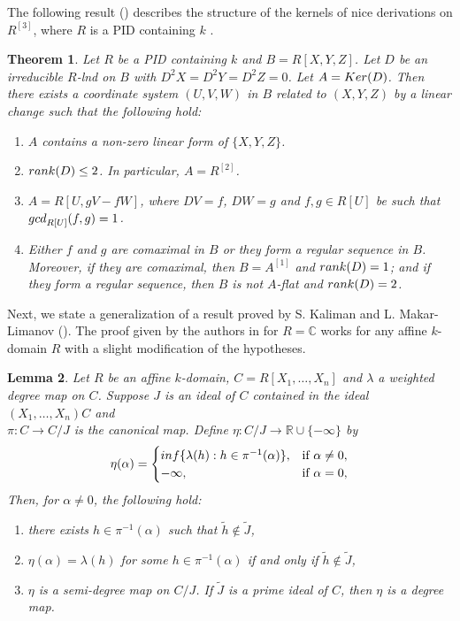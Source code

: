 \documentclass[a4paper,12pt]{article}
\newtheorem{thm}{Theorem}[section]
\newtheorem{lem}[thm]{Lemma}
\newcommand{\bR}{\mathbb R}
\newcommand{\bC}{\mathbb C}
\begin{document}
{\smallskip
\indent
The following result (\cite[Theorem 3.6]{DG}) describes the structure of the kernels of nice derivations on $R^{[3]}$, where $R$ is a PID containing $k$ .

\begin{thm}\label{Nice}
Let $R$ be a {\rm PID} containing $k$ and $B=R[X,Y,Z]$.
Let $D$ be an irreducible $R$-lnd on $B$ with $D^{2}X=D^{2}Y=D^{2}Z=0$. Let $A={\rm Ker}(D)$. 
Then there exists a coordinate system $(U,V,W)$ in $B$ related to $(X,Y,Z)$ by a linear change such that the following hold:
\begin{enumerate}
	\item [\rm (i)] $A$ contains a non-zero linear form of $\{X,Y,Z\}$.
	\item [\rm (ii)] ${\rm rank}(D)\leq 2$. In particular, $A=R^{[2]}$.
	\item [\rm (iii)] $A=R[U,gV-fW]$, where $DV=f$, $DW=g$ and $f,g\in R[U]$ be such that ${\rm gcd}_{R[U]}(f,g)=1$.
	\item [\rm (iv)] Either $f$ and $g$ are comaximal in $B$ or they form a regular sequence in $B$. Moreover, if they are 
	comaximal, then $B=A^{[1]}$ and ${\rm rank}(D)=1$; and if they form a regular sequence, then $B$ is not $A$-flat and ${\rm rank}(D)=2$. 
\end{enumerate}
\end{thm}

\smallskip
\indent
Next, we state a generalization of a result proved by S. Kaliman and L. Makar-Limanov (\cite{KML}). The proof given by the authors in \cite{KML} for $R=\bC$ works for any affine $k$-domain $R$ with a slight modification of the hypotheses.
\begin{lem}\label{MKL}
Let $R$ be an affine $k$-domain, $C=R[X_1,\dots,X_n]$ and $\lambda$ a weighted degree map on $C$. Suppose  $J$ is an ideal of $C$ contained in the ideal $(X_1,\dots,X_n)C$ and \\$\pi:C \rightarrow C/J$ is the canonical map. Define $\eta:C/J\longrightarrow\bR\cup\{-\infty\}$ by $$\eta(\alpha)=
\begin{cases}
	{\rm inf}\{\lambda(h):h\in{\pi}^{-1}(\alpha)\},& \text{if } \alpha\neq 0, \\
	-\infty,& \text{if }\alpha=0,
\end{cases}
$$ Then, for $\alpha\neq 0$, the following hold:
\begin{enumerate}
	\item[\rm(i)] there exists $h\in\pi^{-1}(\alpha)$ such that $\widetilde{h}\notin{\widetilde{J}}$,
	\item[\rm(ii)]$\eta(\alpha)=\lambda(h)$ for some $h\in\pi^{-1}(\alpha)$ if and only if $\widetilde{h}\notin\widetilde{J}$,
	\item[\rm(iii)] $\eta$ is a semi-degree map on $C/J$. If $\widetilde{J}$ is a prime ideal of $C$, then $\eta$ is a degree map.
\end{enumerate}
\end{lem}


}
\end{document}
